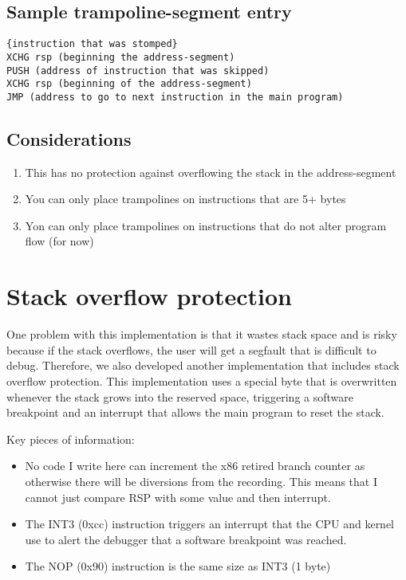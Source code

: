 \subsection{Sample trampoline-segment entry}
\begin{verbatim}
{instruction that was stomped}
XCHG rsp (beginning the address-segment)
PUSH (address of instruction that was skipped)
XCHG rsp (beginning of the address-segment)
JMP (address to go to next instruction in the main program)
\end{verbatim}

\subsection{Considerations}
\begin{enumerate}
    \item This has no protection against overflowing the stack in the address-segment
    \item You can only place trampolines on instructions that are 5+ bytes 
    \item Yon can only place trampolines on instructions that do not alter program flow (for now)
\end{enumerate}


\section{Stack overflow protection}
One problem with this implementation is that it wastes stack space and is risky because if the stack overflows, the user will get a segfault that is difficult to debug. Therefore, we also developed another implementation that includes stack overflow protection. This implementation uses a special byte that is overwritten whenever the stack grows into the reserved space, triggering a software breakpoint and an interrupt that allows the main program to reset the stack.

\noindent Key pieces of information:
\begin{itemize}
    \item No code I write here can increment the x86 retired branch counter as otherwise there will be diversions from the recording. This means that I cannot just compare RSP with some value and then interrupt. 
    \item The INT3 (0xcc) instruction triggers an interrupt that the CPU and kernel use to alert the debugger that a software breakpoint was reached.
    \item The NOP (0x90) instruction is the same size as INT3 (1 byte) 
\end{itemize}

